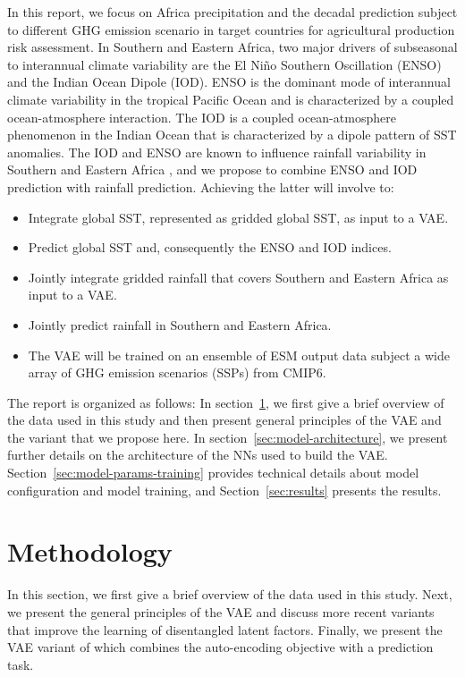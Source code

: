 \documentclass[english,a4paper,10pt]{scrartcl}
\begin{document}
In this report, we focus on Africa precipitation and the decadal prediction subject to different GHG
emission scenario in target countries for agricultural production risk assessment. In Southern and Eastern Africa, two major drivers of subseasonal to interannual climate variability are the El Niño Southern Oscillation (ENSO) and the Indian Ocean Dipole (IOD). ENSO is the dominant mode of interannual climate variability in the tropical Pacific Ocean and is characterized by a coupled ocean-atmosphere interaction. The IOD is a coupled ocean-atmosphere phenomenon in the Indian Ocean that is characterized by a dipole pattern of SST anomalies. The IOD and ENSO are known to influence rainfall variability in Southern and Eastern Africa \citep{Kundzewicz.Szwed.ea.2019,Nicholson.2017}, and we propose to combine ENSO and IOD prediction with rainfall prediction. Achieving the latter will involve to:

\begin{itemize}
    \item Integrate global SST, represented as gridded global SST, as input to a VAE.
    \item Predict global SST and, consequently the ENSO and IOD indices.
    \item Jointly integrate gridded rainfall that covers Southern and Eastern Africa as input to a VAE.
    \item Jointly predict rainfall in Southern and Eastern Africa.
    \item The VAE will be trained on an ensemble of ESM output data subject a wide array of GHG emission scenarios (SSPs) from CMIP6.
\end{itemize}

The report is organized as follows: In section~\ref{sec:methodology}, we first give a brief overview of the data used in this study and then present general principles of the VAE and the variant that we propose here. In section~\ref{sec:model-architecture}, we present further details on the architecture of the NNs used to build the VAE. Section~\ref{sec:model-params-training} provides technical details about model configuration and model training, and Section~\ref{sec:results} presents the results.

\section{Methodology}\label{sec:methodology}

In this section, we first give a brief overview of the data used in this study. Next, we present the general principles of the VAE and discuss more recent variants that improve the learning of disentangled latent factors. Finally, we present the VAE variant of \cite{Groth.Chavez.2023} which combines the auto-encoding objective with a prediction task.
\end{document}
